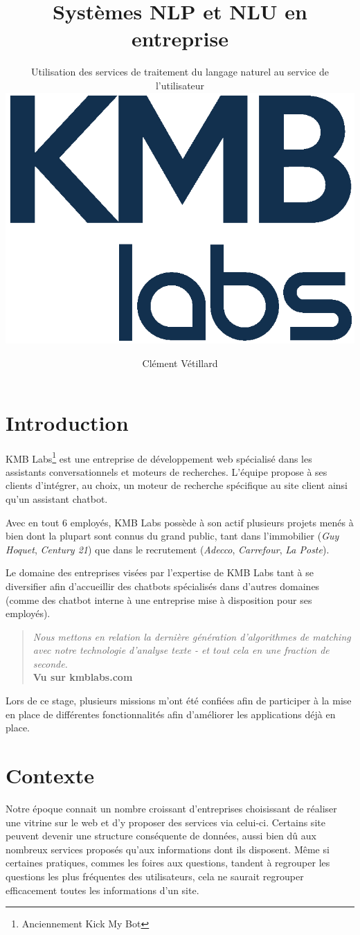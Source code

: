 \documentclass[12pt,a4paper,twoside]{scrreprt}
\title{Systèmes NLP et NLU en entreprise}
\subtitle{
	Utilisation des services de traitement du langage naturel au service de l'utilisateur\\
	\vspace{0.3cm}
	\includegraphics{pictures/kmb}
}
\author{Clément Vétillard}
\date{\vfill}
\begin{document}
\maketitle

\abstract{}

\tableofcontents
\thispagestyle{empty}

\chapter*{Introduction}
KMB Labs\footnote{Anciennement Kick My Bot} est une entreprise de développement web spécialisé dans les assistants conversationnels et moteurs de recherches. L'équipe propose à ses clients d'intégrer, au choix, un moteur de recherche spécifique au site client ainsi qu'un assistant chatbot.

Avec en tout 6 employés, KMB Labs possède à son actif plusieurs projets menés à bien dont la plupart sont connus du grand public, tant dans l'immobilier (\textit{Guy Hoquet}, \textit{Century 21}) que dans le recrutement (\textit{Adecco}, \textit{Carrefour}, \textit{La Poste}).

Le domaine des entreprises visées par l'expertise de KMB Labs tant à se diversifier afin d'accueillir des chatbots spécialisés dans d'autres domaines (comme des chatbot interne à une entreprise mise à disposition pour ses employés).

\begin{quote}
	\og \textit{Nous mettons en relation la dernière génération d'algorithmes de matching avec notre technologie d'analyse texte - et tout cela en une fraction de seconde.}\fg{}\\
	\textbf{Vu sur kmblabs.com}
\end{quote}

Lors de ce stage, plusieurs missions m'ont été confiées afin de participer à la mise en place de différentes fonctionnalités afin d'améliorer les applications déjà en place.

\chapter{Contexte}
Notre époque connait un nombre croissant d'entreprises choisissant de réaliser une vitrine sur le web et d'y proposer des services via celui-ci. Certains site peuvent devenir une structure conséquente de données, aussi bien dû aux nombreux services proposés qu'aux informations dont ils disposent. Même si certaines pratiques, commes les foires aux questions, tandent à regrouper les questions les plus fréquentes des utilisateurs, cela ne saurait regrouper efficacement toutes les informations d'un site.
\end{document}
